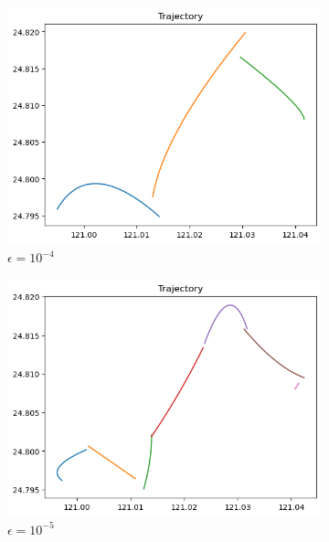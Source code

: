 \documentclass[12pt, a4paper]{article}
\begin{document}
\begin{figure}[htbp]
\centering
\begin{subfigure}{.45\linewidth}
\includegraphics[width=\linewidth]{q4_a}
\caption{$\epsilon=10^{-4}$}
\end{subfigure}
\begin{subfigure}{.45\linewidth}
\includegraphics[width=\linewidth]{q4_b}
\caption{$\epsilon=10^{-5}$}
\end{subfigure}
\begin{subfigure}{.45\linewidth}

\end{subfigure}
\end{figure}
\end{document}
